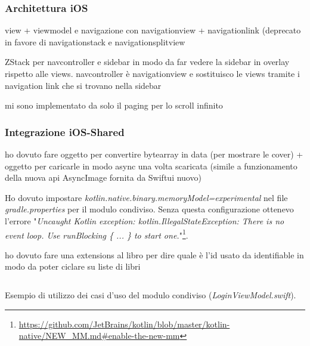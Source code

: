 \subsubsection{Architettura iOS}
view + viewmodel e navigazione con navigationview + navigationlink (deprecato in favore di navigationstack e navigationsplitview

ZStack per navcontroller e sidebar in modo da far vedere la sidebar in overlay rispetto alle views. navcontroller è navigationview e sostituisco le views tramite i navigation link che si trovano nella sidebar

mi sono implementato da solo il paging per lo scroll infinito

\subsubsection{Integrazione iOS-Shared}
ho dovuto fare oggetto per convertire bytearray in data (per mostrare le cover) + oggetto per caricarle in modo async una volta scaricata (simile a funzionamento della nuova api AsyncImage fornita da Swiftui nuovo)

Ho dovuto impostare \textit{kotlin.native.binary.memoryModel=experimental} nel file \textit{gradle.properties} per il modulo condiviso. Senza questa configurazione ottenevo l'errore "\textit{Uncaught Kotlin exception: kotlin.IllegalStateException: There is no event loop. Use runBlocking \{ ... \} to start one.}"\footnote{\url{https://github.com/JetBrains/kotlin/blob/master/kotlin-native/NEW_MM.md\#enable-the-new-mm}}.

ho dovuto fare una extensions al libro per dire quale è l'id usato da identifiable in modo da poter ciclare su liste di libri

\begin{listing}[H]
\inputminted{swift}{code/5-swift-shared}
\caption{Esempio di utilizzo dei casi d'uso del modulo condiviso (\textit{LoginViewModel.swift}).}
\end{listing}

\newpage

